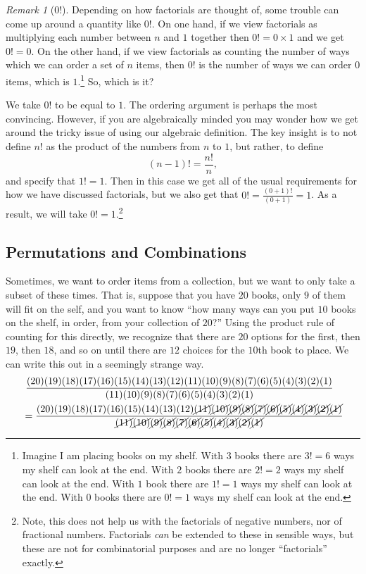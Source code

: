 \documentclass[
  letterpaper,
  DIV=11,
  numbers=noendperiod]{scrreprt}
\theoremstyle{definition}
\theoremstyle{definition}
\theoremstyle{definition}
\theoremstyle{remark}
\newtheorem*{remark}{Remark}
\begin{document}
\begin{remark}[0!]
Depending on how factorials are thought of, some trouble can come up
around a quantity like \(0!\). On one hand, if we view factorials as
multiplying each number between \(n\) and \(1\) together then
\(0! = 0\times 1\) and we get \(0! = 0\). On the other hand, if we view
factorials as counting the number of ways which we can order a set of
\(n\) items, then \(0!\) is the number of ways we can order \(0\) items,
which is \(1\).\footnote{Imagine I am placing books on my shelf. With
  \(3\) books there are \(3! = 6\) ways my shelf can look at the end.
  With \(2\) books there are \(2! = 2\) ways my shelf can look at the
  end. With \(1\) book there are \(1! = 1\) ways my shelf can look at
  the end. With \(0\) books there are \(0! = 1\) ways my shelf can look
  at the end.} So, which is it?

We take \(0!\) to be equal to \(1\). The ordering argument is perhaps
the most convincing. However, if you are algebraically minded you may
wonder how we get around the tricky issue of using our algebraic
definition. The key insight is to not define \(n!\) as the product of
the numbers from \(n\) to \(1\), but rather, to define
\[(n-1)! = \frac{n!}{n},\] and specify that \(1! = 1\). Then in this
case we get all of the usual requirements for how we have discussed
factorials, but we also get that \(0! = \frac{(0+1)!}{(0+1)} = 1\). As a
result, we will take \(0! = 1\).\footnote{Note, this does not help us
  with the factorials of negative numbers, nor of fractional numbers.
  Factorials \emph{can} be extended to these in sensible ways, but these
  are not for combinatorial purposes and are no longer ``factorials''
  exactly.}
\end{remark}

\subsection{Permutations and
Combinations}\label{permutations-and-combinations}

Sometimes, we want to order items from a collection, but we want to only
take a subset of these times. That is, suppose that you have \(20\)
books, only \(9\) of them will fit on the self, and you want to know
``how many ways can you put \(10\) books on the shelf, in order, from
your collection of \(20\)?'' Using the product rule of counting for this
directly, we recognize that there are \(20\) options for the first, then
\(19\), then \(18\), and so on until there are \(12\) choices for the
\(10\)th book to place. We can write this out in a seemingly strange
way. \begin{align*}
  &\ \frac{(20)(19)(18)(17)(16)(15)(14)(13)(12)(11)(10)(9)(8)(7)(6)(5)(4)(3)(2)(1)}{(11)(10)(9)(8)(7)(6)(5)(4)(3)(2)(1)} \\
  &= \frac{(20)(19)(18)(17)(16)(15)(14)(13)(12)\cancel{(11)}\cancel{(10)}\cancel{(9)}\cancel{(8)}\cancel{(7)}\cancel{(6)}\cancel{(5)}\cancel{(4)}\cancel{(3)}\cancel{(2)}\cancel{(1)}}{\cancel{(11)}\cancel{(10)}\cancel{(9)}\cancel{(8)}\cancel{(7)}\cancel{(6)}\cancel{(5)}\cancel{(4)}\cancel{(3)}\cancel{(2)}\cancel{(1)}}
\end{align*}
\end{document}
